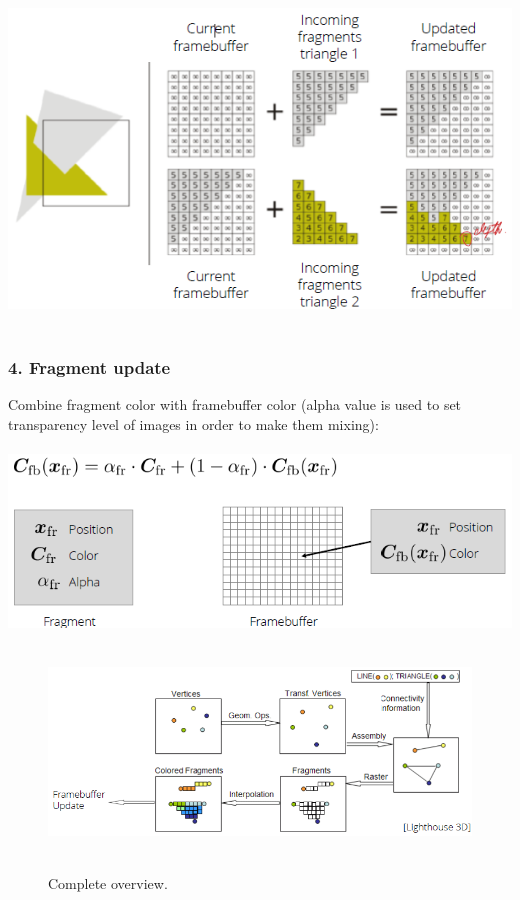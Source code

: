 \documentclass{article}
\begin{document}
\includegraphics[scale=0.6]{image61.png}\\\\
\subsubsection{4. Fragment update}
Combine fragment color with framebuffer color (alpha value is used to set transparency level of images in order to make them mixing):\\\\
\includegraphics[scale=0.6]{image62.png}\\\\
\begin{figure}[h!]
\includegraphics[scale=0.6]{image53.png}\\\\
\caption{Complete overview.}
\end{figure}
\end{document}
